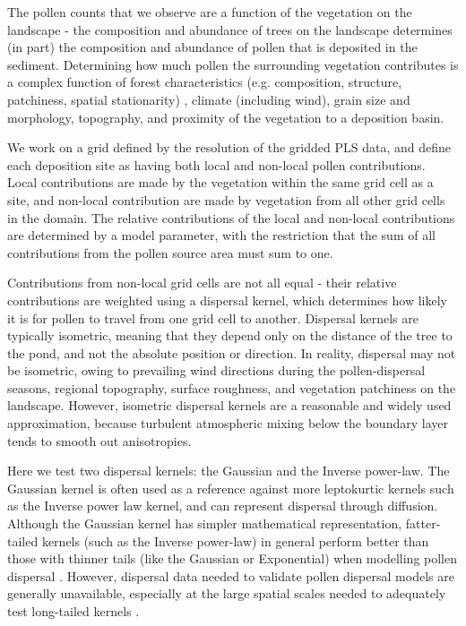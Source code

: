 \documentclass[12pt]{article}
\begin{document}
The pollen counts that we observe are a function of the vegetation on
the landscape - the composition and abundance of trees on the
landscape determines (in part) the composition and abundance of pollen
that is deposited in the sediment. Determining how much pollen the
surrounding vegetation contributes is a complex function of forest
characteristics (e.g. composition, structure, patchiness, spatial
stationarity) , climate (including wind), grain size and morphology,
topography, and proximity of the vegetation to a deposition basin.

We work on a grid defined by the resolution of the gridded PLS data,
and define each deposition site as having both local and non-local
pollen contributions. Local contributions are made by the vegetation
within the same grid cell as a site, and non-local contribution are
made by vegetation from all other grid cells in the domain. The
relative contributions of the local and non-local contributions are
determined by a model parameter, with the restriction that the sum of
all contributions from the pollen source area must sum to one.

Contributions from non-local grid cells are not all equal - their
relative contributions are weighted using a dispersal kernel, which
determines how likely it is for pollen to travel from one grid cell to
another. Dispersal kernels are typically isometric, meaning that they
depend only on the distance of the tree to the pond, and not the
absolute position or direction. In reality, dispersal may not be
isometric, owing to prevailing wind directions during the
pollen-dispersal seasons, regional topography, surface roughness, and
vegetation patchiness on the landscape. However, isometric dispersal
kernels are a reasonable and widely used approximation, because
turbulent atmospheric mixing below the boundary layer tends to smooth
out anisotropies.

Here we test two dispersal kernels: the Gaussian and the Inverse
power-law. The Gaussian kernel is often used as a reference against
more leptokurtic kernels such as the Inverse power law kernel, and can
represent dispersal through diffusion. Although the Gaussian kernel
has simpler mathematical representation, fatter-tailed kernels (such
as the Inverse power-law) in general perform better than those with
thinner tails (like the Gaussian or Exponential) when modelling pollen
dispersal \citep{devaux2007modelling, austerlitz2004using}. However,
dispersal data needed to validate pollen dispersal models are
generally unavailable, especially at the large spatial scales needed
to adequately test long-tailed kernels \citep{clobert2012dispersal}.
\end{document}
